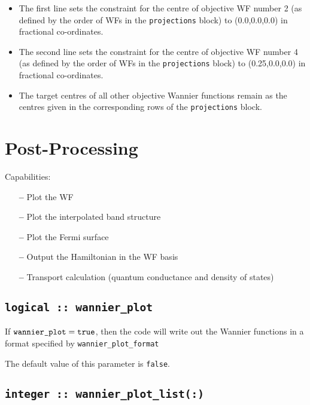 \begin{itemize}
\item The first line sets the constraint for the centre of objective WF number 2 (as defined by the order of WFs in the {\tt projections} block) to (0.0,0.0,0.0) in fractional co-ordinates.
\item The second line sets the constraint for the centre of objective WF number 4 (as defined by the order of WFs in the {\tt projections} block) to (0.25,0.0,0.0) in fractional co-ordinates.
\item The target centres of all other objective Wannier functions remain as the centres given in the corresponding rows of the {\tt projections} block.
\end{itemize}

\section{Post-Processing}
\label{sec:post-p}

 Capabilities:

\begin{itemize}
\item[{\bf --}]  Plot the WF
\item[{\bf --}]  Plot the interpolated band structure
\item[{\bf --}]  Plot the Fermi surface
\item[{\bf --}]  Output the Hamiltonian in the WF basis
\item[{\bf --}]  Transport calculation (quantum conductance and
  density of states)
\end{itemize}


\subsection[wannier\_plot]{\tt logical :: wannier\_plot}

If $\verb#wannier_plot#=\verb#true#$, then the code will write out the
Wannier functions in a format specified by \verb#wannier_plot_format#

The default value of this parameter is \verb#false#.


\subsection[wannier\_plot\_list]{\tt integer :: wannier\_plot\_list(:)}


